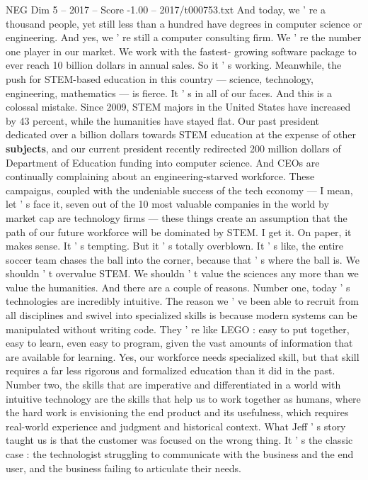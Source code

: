 \begin{textsample}{NEG Dim 5 – 2017 – Score -1.00 – 2017/t000753.txt}
And today, we ' re a thousand people, yet still less than a hundred have degrees in computer science or engineering.
And yes, we ' re still a computer consulting firm.
We ' re the number one player in our market.
We work with the fastest- growing software package to ever reach 10 billion dollars in annual sales.
So it ' s working.
Meanwhile, the push for STEM-based education in this country — science, technology, engineering, mathematics — is fierce.
It ' s in all of our faces.
And this is a colossal mistake.
Since 2009, STEM majors in the United States have increased by 43 percent, while the humanities have stayed flat.
Our past president dedicated over a billion dollars towards STEM education at the expense of other \textbf{subjects}, and our current president recently redirected 200 million dollars of Department of Education funding into computer science.
And CEOs are continually complaining about an engineering-starved workforce.
These campaigns, coupled with the undeniable success of the tech economy — I mean, let ' s face it, seven out of the 10 most valuable companies in the world by market cap are technology firms — these things create an assumption that the path of our future workforce will be dominated by STEM.
I get it.
On paper, it makes sense.
It ' s tempting.
But it ' s totally overblown.
It ' s like, the entire soccer team chases the ball into the corner, because that ' s where the ball is.
We shouldn ' t overvalue STEM.
We shouldn ' t value the sciences any more than we value the humanities.
And there are a couple of reasons.
Number one, today ' s technologies are incredibly intuitive.
The reason we ' ve been able to recruit from all disciplines and swivel into specialized skills is because modern systems can be manipulated without writing code.
They ' re like LEGO : easy to put together, easy to learn, even easy to program, given the vast amounts of information that are available for learning.
Yes, our workforce needs specialized skill, but that skill requires a far less rigorous and formalized education than it did in the past.
Number two, the skills that are imperative and differentiated in a world with intuitive technology are the skills that help us to work together as humans, where the hard work is envisioning the end product and its usefulness, which requires real-world experience and judgment and historical context.
What Jeff ' s story taught us is that the customer was focused on the wrong thing.
It ' s the classic case : the technologist struggling to communicate with the business and the end user, and the business failing to articulate their needs.

\end{textsample}
